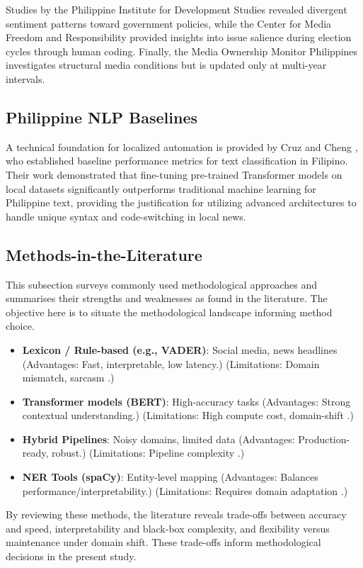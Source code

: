 Studies by the Philippine Institute for Development Studies \cite{ref25} revealed divergent sentiment patterns toward government policies, while the Center for Media Freedom and Responsibility \cite{ref17} provided insights into issue salience during election cycles through human coding. Finally, the Media Ownership Monitor Philippines \cite{ref24} investigates structural media conditions but is updated only at multi-year intervals.

\subsection{Philippine NLP Baselines}
\label{philippine-nlp-baselines}

A technical foundation for localized automation is provided by Cruz and Cheng \cite{ref02}, who established baseline performance metrics for text classification in Filipino. Their work demonstrated that fine-tuning pre-trained Transformer models on local datasets significantly outperforms traditional machine learning for Philippine text, providing the justification for utilizing advanced architectures to handle unique syntax and code-switching in local news.

\subsection{Methods-in-the-Literature}
\label{methods-in-the-literature}

This subsection surveys commonly used methodological approaches and summarises their strengths and weaknesses as found in the literature. The objective here is to situate the methodological landscape informing method choice.



\begin{itemize}
\item \textbf{Lexicon / Rule-based (e.g., VADER)}: Social media, news headlines (Advantages: Fast, interpretable, low latency.) (Limitations: Domain mismatch, sarcasm \cite{ref08}.)
\item \textbf{Transformer models (BERT)}: High-accuracy tasks (Advantages: Strong contextual understanding.) (Limitations: High compute cost, domain-shift \cite{ref10,ref14}.)
\item \textbf{Hybrid Pipelines}: Noisy domains, limited data (Advantages: Production-ready, robust.) (Limitations: Pipeline complexity \cite{ref09}.)
\item \textbf{NER Tools (spaCy)}: Entity-level mapping (Advantages: Balances performance/interpretability.) (Limitations: Requires domain adaptation \cite{ref12,ref26}.)
\end{itemize}
By reviewing these methods, the literature reveals trade-offs between accuracy and speed, interpretability and black-box complexity, and flexibility versus maintenance under domain shift. These trade-offs inform methodological decisions in the present study.

